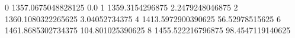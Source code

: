 0 1357.0675048828125 0.0
1 1359.3154296875 2.2479248046875
2 1360.1080322265625 3.04052734375
4 1413.5972900390625 56.52978515625
6 1461.8685302734375 104.801025390625
8 1455.522216796875 98.4547119140625

